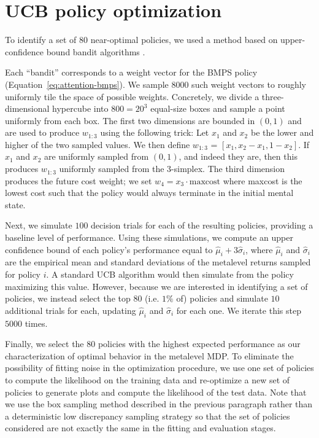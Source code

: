 \section{UCB policy optimization}\label{sec:attention-ucb}

To identify a set of 80 near-optimal policies, we used a method based on upper-confidence bound bandit algorithms \citep{auer2002finite}.

Each ``bandit'' corresponds to a weight vector for the BMPS policy (Equation~\ref{eq:attention-bmps}). We sample $8000$ such weight vectors to roughly uniformly tile the space of possible weights. Concretely, we divide a three-dimensional hypercube into $800= 20^3$ equal-size boxes and sample a point uniformly from each box. The first two dimensions are bounded in $(0, 1)$ and are used to produce $w_{1:3}$ using the following trick: Let $x_1$ and $x_2$ be the lower and higher of the two sampled values. We then define $w_{1:3}$ = $[x_1, x_2 - x_1, 1 - x_2]$. If $x_1$ and $x_2$ are uniformly sampled from $(0, 1)$, and indeed they are, then this produces $w_{1:3}$ uniformly sampled from the 3-simplex. The third dimension produces the future cost weight; we set $w_4 = x_3 \cdot \mathrm{maxcost}$ where maxcost is the lowest cost such that the policy would always terminate in the initial mental state. 

Next, we simulate $100$ decision trials for each of the resulting policies, providing a baseline level of performance. Using these simulations, we compute an upper confidence bound of each policy's performance equal to $\hat{\mu}_i + 3\hat{\sigma}_i$, where $\hat{\mu}_i$ and $\hat{\sigma}_i$ are the empirical mean and standard deviations of the metalevel returns sampled for policy $i$. A standard UCB algorithm would then simulate from the policy maximizing this value. However, because we are interested in identifying a set of policies, we instead select the top $80$ (i.e. $1\%$ of) policies and simulate $10$ additional trials for each, updating $\hat{\mu}_i$ and $\hat{\sigma}_i$ for each one. We iterate this step $5000$ times. 

Finally, we select the $80$ policies with the highest expected performance as our characterization of optimal behavior in the metalevel MDP. To eliminate the possibility of fitting noise in the optimization procedure, we use one set of policies to compute the likelihood on the training data and re-optimize a new set of policies to generate plots and compute the likelihood of the test data. Note that we use the box sampling method described in the previous paragraph rather than a deterministic low discrepancy sampling strategy \citep{sobol1967distribution} so that the set of policies considered are not exactly the same in the fitting and evaluation stages.


